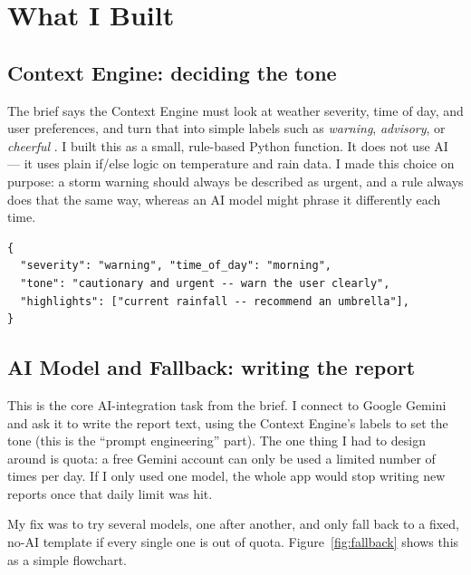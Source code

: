\documentclass[11pt, a4paper]{article}
\begin{document}
\section{What I Built}

\subsection{Context Engine: deciding the tone}

The brief says the Context Engine must look at weather severity, time of day, and user
preferences, and turn that into simple labels such as \textit{warning}, \textit{advisory},
or \textit{cheerful} \citep{weatherfish2026}. I built this as a small, rule-based Python
function. It does not use AI --- it uses plain if/else logic on temperature and rain data.
I made this choice on purpose: a storm warning should always be described as urgent, and a
rule always does that the same way, whereas an AI model might phrase it differently each
time.

\begin{lstlisting}[style=pythonstyle, caption={What the Context Engine outputs. This
  small object is then handed to the AI model as instructions.}]
{
  "severity": "warning", "time_of_day": "morning",
  "tone": "cautionary and urgent -- warn the user clearly",
  "highlights": ["current rainfall -- recommend an umbrella"],
}
\end{lstlisting}

\subsection{AI Model and Fallback: writing the report}

This is the core AI-integration task from the brief. I connect to Google Gemini and ask it
to write the report text, using the Context Engine's labels to set the tone (this is the
``prompt engineering'' part). The one thing I had to design around is quota: a free Gemini
account can only be used a limited number of times per day. If I only used one model, the
whole app would stop writing new reports once that daily limit was hit.

My fix was to try several models, one after another, and only fall back to a fixed,
no-AI template if every single one is out of quota. Figure~\ref{fig:fallback} shows this
as a simple flowchart.
\end{document}
